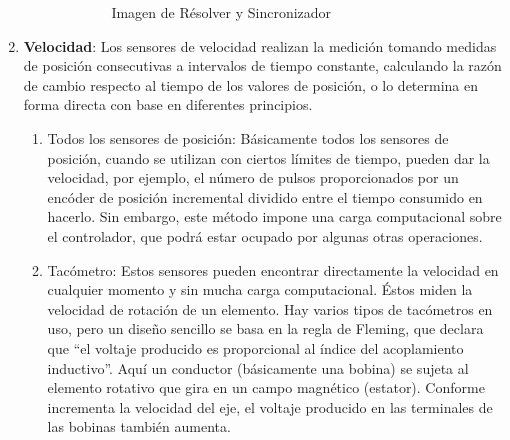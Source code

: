 \begin{enumerate}
\begin{enumerate}
\begin{enumerate}
\begin{figure}[!h]
	\centering
	\caption{Imagen de Résolver y Sincronizador}
	\label{fig:Resolver_sinc}
	
	
\end{figure}
		
				\end{enumerate}
			\end{enumerate}
\vspace{10mm}
			\item \textbf{Velocidad}: Los sensores de velocidad realizan la medición tomando medidas de posición consecutivas a intervalos de tiempo constante, calculando la razón de cambio respecto al tiempo de los valores de posición, o lo determina en forma directa con base en diferentes principios.\cite{saha2010robotics}\\
           
			
			\begin{enumerate}
				\item Todos los sensores de posición:
				Básicamente todos los sensores de posición, cuando se utilizan con ciertos límites de tiempo, pueden dar la velocidad, por ejemplo, el número de pulsos proporcionados por un encóder de posición incremental dividido entre el tiempo consumido en hacerlo. Sin embargo, este método impone una carga computacional sobre el controlador, que podrá estar ocupado por algunas otras operaciones.\\
		
		\begin{figure}[!ht]
			\centering
			\hfill
		\end{figure}
				
				\item Tacómetro: Estos sensores pueden encontrar directamente la velocidad en cualquier momento y sin mucha carga computacional. Éstos miden la velocidad de rotación de un elemento. Hay varios tipos de tacómetros en uso, pero un diseño sencillo se basa en la regla de Fleming, que declara que “el voltaje producido es proporcional al índice del acoplamiento inductivo”. Aquí un conductor (básicamente una bobina) se sujeta al elemento rotativo que gira en un campo magnético (estator). Conforme incrementa la velocidad del eje, el voltaje producido en las terminales de las bobinas también aumenta.\cite{saha2010robotics}\\
				

\end{enumerate}
\end{enumerate}
